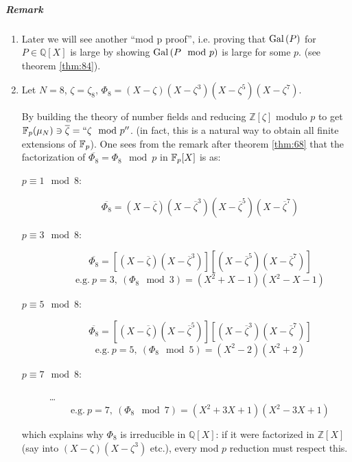 
\subparagraph{Remark}

\begin{enumerate}
\item Later we will see another ``mod p proof'', i.e. proving that $\text{Gal}\left(P\right)$ for $P \in \mathbb{Q}[X]$ is large by showing $\text{Gal}\left(P \mod p\right)$ is large for some $p$. (see theorem \ref{thm:84}).

\item Let $N = 8$, $\zeta = \zeta_8$, $\Phi_8 = (X-\zeta)(X-\zeta^3)(X-\zeta^5)(X-\zeta^7)$.
  \begin{figure}[H]
    \centering
  \end{figure}
 By building the theory of number fields and reducing $\mathbb{Z}[\zeta]$ modulo $p$ to get $\mathbb{F}_{p}(\mathbf{\mu}_{N}) \ni \overline{\zeta} = ``\zeta \mod p''$. (in fact, this is a natural way to obtain all finite extensions of $\mathbb{F}_{p}$). One sees from the remark after theorem \ref{thm:68} that the factorization of $\overline{\Phi_8} = \Phi_8 \mod p$ in $\mathbb{F}_{p}[X]$ is as:
  \begin{description}
  \item[$p \equiv 1 \mod 8$: ] 
\[
\overline{\Phi_8} = \left(X - \overline{\zeta}\right)\left(X - \overline{\zeta}^3\right)\left(X - \overline{\zeta}^5\right)\left(X - \overline{\zeta}^7\right)
\]
  \item[$p \equiv 3 \mod 8$: ] 
\[
\overline{\Phi_8} = \left[\left(X-\overline{\zeta}\right)\left(X-\overline{\zeta}^3\right)\right]\left[\left(X-\overline{\zeta}^5\right)\left(X-\overline{\zeta}^7\right)\right]
\]
\[
\text{e.g.} \ p = 3, \ (\Phi_8 \mod 3) = \left(X^2+X-1\right)\left(X^2-X-1\right)
\]
  \item[$p \equiv 5 \mod 8$: ] 
\[
\overline{\Phi_8} = \left[\left(X-\overline{\zeta}\right)\left(X-\overline{\zeta}^5\right)\right]\left[\left(X-\overline{\zeta}^3\right)\left(X-\overline{\zeta}^7\right)\right]
\]
\[
\text{e.g.} \ p = 5, \ (\Phi_8 \mod 5) = \left(X^2-2\right)\left(X^2+2\right)
\]
  \item[$p \equiv 7 \mod 8$: ] \ldots
\[
\text{e.g.} \ p = 7, \ (\Phi_8 \mod 7) = \left(X^2 + 3X + 1\right)\left(X^2-3X+1\right)
\]
  \end{description}
which explains why $\Phi_8$ is irreducible in $\mathbb{Q}[X]$: if it were factorized in $\mathbb{Z}[X]$ (say into $(X-\zeta)(X-\zeta^3)$ etc.), every mod $p$ reduction must respect this.


\end{enumerate}
